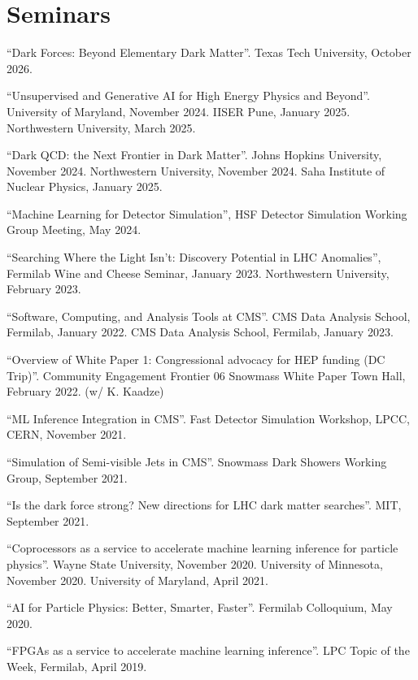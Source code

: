 \section{Seminars}
\begin{nbdescription}[leftmargin=12pt,font=\normalfont,labelsep=0em]
\item ``Dark Forces: Beyond Elementary Dark Matter''. Texas Tech University, October 2026.
\item ``Unsupervised and Generative AI for High Energy Physics and Beyond''. University of Maryland, November 2024. IISER Pune, January 2025. Northwestern University, March 2025.
\item ``Dark QCD: the Next Frontier in Dark Matter''. Johns Hopkins University, November 2024. Northwestern University, November 2024. Saha Institute of Nuclear Physics, January 2025.
\item ``Machine Learning for Detector Simulation'', HSF Detector Simulation Working Group Meeting, May 2024.
\item ``Searching Where the Light Isn't: Discovery Potential in LHC Anomalies'', Fermilab Wine and Cheese Seminar, January 2023. Northwestern University, February 2023.
\item ``Software, Computing, and Analysis Tools at CMS''. CMS Data Analysis School, Fermilab, January 2022. CMS Data Analysis School, Fermilab, January 2023.
\item ``Overview of White Paper 1: Congressional advocacy for HEP funding (DC Trip)''. Community Engagement Frontier 06 Snowmass White Paper Town Hall, February 2022. (w/ K. Kaadze)
\item ``ML Inference Integration in CMS''. Fast Detector Simulation Workshop, LPCC, CERN, November 2021.
\item ``Simulation of Semi-visible Jets in CMS''. Snowmass Dark Showers Working Group, September 2021.
\item ``Is the dark force strong? New directions for LHC dark matter searches''. MIT, September 2021.
\item ``Coprocessors as a service to accelerate machine learning inference for particle physics''. Wayne State University, November 2020. University of Minnesota, November 2020. University of Maryland, April 2021.
\item ``AI for Particle Physics: Better, Smarter, Faster''. Fermilab Colloquium, May 2020.
\item ``FPGAs as a service to accelerate machine learning inference''. LPC Topic of the Week, Fermilab, April 2019.

\end{nbdescription}
